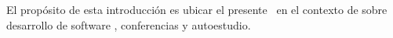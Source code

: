 
\begynd
\pind El propósito de esta introducción es ubicar el presente \primer\
\pind en el contexto de  
      \cite{TheSEBook1,TheSEBook2,TheSEBook3} sobre desarrollo de software 
\pind , conferencias y auto\ysf{-}estudio.
\afslut

\label{chap:Introduction.n}


